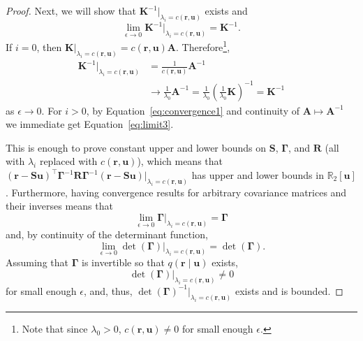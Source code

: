 \documentclass{mpaper}
\begin{document}
\begin{proof}
  Next, we will show that $\mathbf{K}^{-1}|_{\lambda_i = c(\mathbf{r},
    \mathbf{u})}$ exists and
  \begin{equation} \label{eq:limit3}
    \lim_{\epsilon \to 0} \mathbf{K}^{-1}|_{\lambda_i = c(\mathbf{r},
      \mathbf{u})} = \mathbf{K}^{-1}.
  \end{equation}
  If $i = 0$, then $\mathbf{K}|_{\lambda_i = c(\mathbf{r}, \mathbf{u})} =
  c(\mathbf{r}, \mathbf{u})\mathbf{A}$. Therefore\footnote{Note that since
    $\lambda_0 > 0$, $c(\mathbf{r}, \mathbf{u}) \ne 0$ for small enough
    $\epsilon$.},
  \begin{align*}
    \mathbf{K}^{-1}|_{\lambda_i = c(\mathbf{r}, \mathbf{u})} &=
                                                               \frac{1}{c(\mathbf{r}, \mathbf{u})}\mathbf{A}^{-1} \\
                                                             &\to \frac{1}{\lambda_0}\mathbf{A}^{-1} = \frac{1}{\lambda_0} \left( \frac{1}{\lambda_0}\mathbf{K} \right)^{-1} = \mathbf{K}^{-1}
  \end{align*}
  as $\epsilon \to 0$. For $i > 0$, by Equation~\eqref{eq:convergence1} and
  continuity of $\mathbf{A} \mapsto \mathbf{A}^{-1}$ we immediate get
  Equation~\eqref{eq:limit3}.

  This is enough to prove constant upper and lower bounds on
  $\mathbf{S}$, $\bm\Gamma$, and $\mathbf{R}$ (all with $\lambda_i$ replaced
  with $c(\mathbf{r}, \mathbf{u})$), which means that $(\mathbf{r} -
  \mathbf{Su})^\intercal\bm\Gamma^{-1}\mathbf{R}\bm\Gamma^{-1}(\mathbf{r} -
  \mathbf{Su})|_{\lambda_i = c(\mathbf{r}, \mathbf{u})}$ has upper and lower
  bounds in $\mathbb{R}_2[\mathbf{u}]$. Furthermore, having convergence results
  for arbitrary covariance matrices and their inverses means that
  \begin{equation} \label{eq:gamma_convergence}
    \lim_{\epsilon \to 0} \bm\Gamma|_{\lambda_i = c(\mathbf{r}, \mathbf{u})} =
    \bm\Gamma
  \end{equation}
  and, by continuity of the determinant function,
  \begin{equation} \label{eq:det_gamma}
    \lim_{\epsilon \to 0} \det(\bm\Gamma)|_{\lambda_i = c(\mathbf{r}, \mathbf{u})} =
    \det(\bm\Gamma).
  \end{equation}
  Assuming that
  $\bm\Gamma$ is invertible so that $q(\mathbf{r} \mid \mathbf{u})$ exists,
  \[
    \det(\bm\Gamma)|_{\lambda_i = c(\mathbf{r}, \mathbf{u})} \ne 0
  \]
  for small enough $\epsilon$, and, thus, $\det(\bm\Gamma)^{-1}|_{\lambda_i =
    c(\mathbf{r}, \mathbf{u})}$ exists and is bounded.
  

\end{proof}
\end{document}
